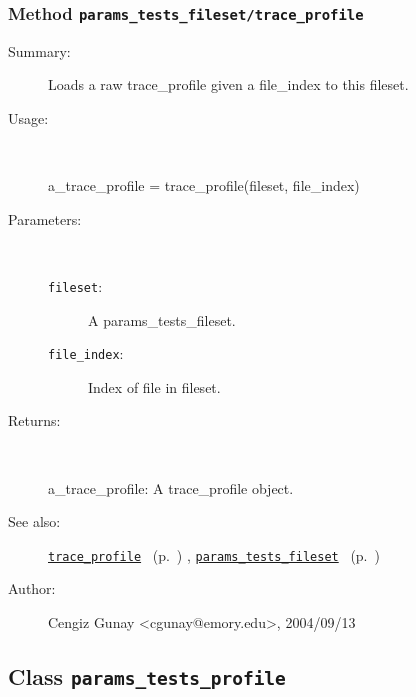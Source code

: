 \subsubsection[Method \texttt{trace\_profile}]{Method \texttt{params\_tests\_fileset/trace\_profile}}%
%
\label{ref_params_tests_fileset__trace_profile}%
\hypertarget{ref_params_tests_fileset__trace_profile}{}%
\begin{description}
\item[Summary:]Loads a raw trace\_profile given a file\_index to this fileset.
%
\item[Usage:]~%
\begin{lyxcode}%
a\_trace\_profile = trace\_profile(fileset, file\_index)
%
\end{lyxcode}%
%
%
\item[Parameters:]~
\begin{description}%
\item[\texttt{fileset}:]
 A params\_tests\_fileset.
\item[\texttt{file\_index}:]
 Index of file in fileset.
\end{description}%
%
\item[Returns:
]~

	a\_trace\_profile: A trace\_profile object.
%
%
\item[See also:]%
\hyperlink{ref_trace_profile}{\texttt{trace\_profile}}%
\ (p.~\pageref{ref_trace_profile})%
%
, \hyperlink{ref_params_tests_fileset}{\texttt{params\_tests\_fileset}}%
\ (p.~\pageref{ref_params_tests_fileset})%
%
%
\item[Author:]%
Cengiz Gunay <cgunay@emory.edu>, 2004/09/13
%
\end{description}
\methodline%
\subsection{Class \texttt{params\_tests\_profile}}%
%
\label{ref_params_tests_profile}%
\hypertarget{ref_params_tests_profile}{}%
